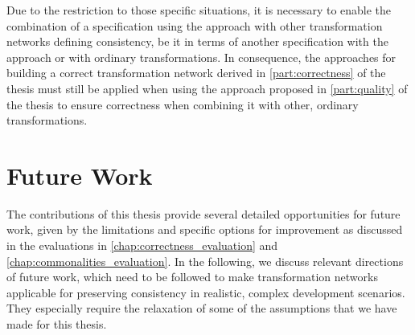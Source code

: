 Due to the restriction to those specific situations, it is necessary to enable the combination of a specification using the \commonalities approach with other transformation networks defining consistency, be it in terms of another specification with the \commonalities approach or with ordinary transformations.
In consequence, the approaches for building a correct transformation network derived in \autoref{part:correctness} of the thesis must still be applied when using the \commonalities approach proposed in \autoref{part:quality} of the thesis to ensure correctness when combining it with other, ordinary transformations.


\section{Future Work}
\label{chap:conclusions:futurework}

The contributions of this thesis provide several detailed opportunities for future work, given by the limitations and specific options for improvement as discussed in the evaluations in \autoref{chap:correctness_evaluation} and \autoref{chap:commonalities_evaluation}.
In the following, we discuss relevant directions of future work, which need to be followed to make transformation networks applicable for preserving consistency in realistic, complex development scenarios.
They especially require the relaxation of some of the assumptions that we have made for this thesis.

